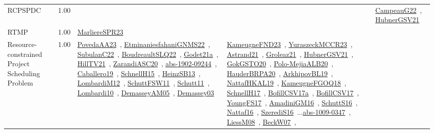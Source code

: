 {\begin{longtable}{p{3cm}r>{\raggedright\arraybackslash}p{6cm}>{\raggedright\arraybackslash}p{6cm}>{\raggedright\arraybackslash}p{8cm}}
\index{RCPSPDC}\index{Classification!RCPSPDC}RCPSPDC &  1.00 &  &  & \href{../works/CampeauG22.pdf}{CampeauG22}~\cite{CampeauG22}, \href{../works/HubnerGSV21.pdf}{HubnerGSV21}~\cite{HubnerGSV21}\\
\index{RTMP}\index{Classification!RTMP}RTMP &  1.00 & \href{../works/MarliereSPR23.pdf}{MarliereSPR23}~\cite{MarliereSPR23} &  & \\
\index{Resource-constrained Project Scheduling Problem}\index{Classification!Resource-constrained Project Scheduling Problem}Resource-constrained Project Scheduling Problem &  1.00 & \href{../works/PovedaAA23.pdf}{PovedaAA23}~\cite{PovedaAA23}, \href{../works/EtminaniesfahaniGNMS22.pdf}{EtminaniesfahaniGNMS22}~\cite{EtminaniesfahaniGNMS22}, \href{../works/SubulanC22.pdf}{SubulanC22}~\cite{SubulanC22}, \href{../works/BoudreaultSLQ22.pdf}{BoudreaultSLQ22}~\cite{BoudreaultSLQ22}, \href{../works/Godet21a.pdf}{Godet21a}~\cite{Godet21a}, \href{../works/HillTV21.pdf}{HillTV21}~\cite{HillTV21}, \href{../works/ZarandiASC20.pdf}{ZarandiASC20}~\cite{ZarandiASC20}, \href{../works/abs-1902-09244.pdf}{abs-1902-09244}~\cite{abs-1902-09244}, \href{../works/Caballero19.pdf}{Caballero19}~\cite{Caballero19}, \href{../works/SchnellH15.pdf}{SchnellH15}~\cite{SchnellH15}, \href{../works/HeinzSB13.pdf}{HeinzSB13}~\cite{HeinzSB13}, \href{../works/LombardiM12.pdf}{LombardiM12}~\cite{LombardiM12}, \href{../works/SchuttFSW11.pdf}{SchuttFSW11}~\cite{SchuttFSW11}, \href{../works/Schutt11.pdf}{Schutt11}~\cite{Schutt11}, \href{../works/Lombardi10.pdf}{Lombardi10}~\cite{Lombardi10}, \href{../works/DemasseyAM05.pdf}{DemasseyAM05}~\cite{DemasseyAM05}, \href{../works/Demassey03.pdf}{Demassey03}~\cite{Demassey03} & \href{../works/KameugneFND23.pdf}{KameugneFND23}~\cite{KameugneFND23}, \href{../works/YuraszeckMCCR23.pdf}{YuraszeckMCCR23}~\cite{YuraszeckMCCR23}, \href{../works/Astrand21.pdf}{Astrand21}~\cite{Astrand21}, \href{../works/Groleaz21.pdf}{Groleaz21}~\cite{Groleaz21}, \href{../works/HubnerGSV21.pdf}{HubnerGSV21}~\cite{HubnerGSV21}, \href{../works/GokGSTO20.pdf}{GokGSTO20}~\cite{GokGSTO20}, \href{../works/Polo-MejiaALB20.pdf}{Polo-MejiaALB20}~\cite{Polo-MejiaALB20}, \href{../works/HauderBRPA20.pdf}{HauderBRPA20}~\cite{HauderBRPA20}, \href{../works/ArkhipovBL19.pdf}{ArkhipovBL19}~\cite{ArkhipovBL19}, \href{../works/NattafHKAL19.pdf}{NattafHKAL19}~\cite{NattafHKAL19}, \href{../works/KameugneFGOQ18.pdf}{KameugneFGOQ18}~\cite{KameugneFGOQ18}, \href{../works/SchnellH17.pdf}{SchnellH17}~\cite{SchnellH17}, \href{../works/BofillCSV17a.pdf}{BofillCSV17a}~\cite{BofillCSV17a}, \href{../works/BofillCSV17.pdf}{BofillCSV17}~\cite{BofillCSV17}, \href{../works/YoungFS17.pdf}{YoungFS17}~\cite{YoungFS17}, \href{../works/AmadiniGM16.pdf}{AmadiniGM16}~\cite{AmadiniGM16}, \href{../works/SchuttS16.pdf}{SchuttS16}~\cite{SchuttS16}, \href{../works/Nattaf16.pdf}{Nattaf16}~\cite{Nattaf16}, \href{../works/SzerediS16.pdf}{SzerediS16}~\cite{SzerediS16}...\href{../works/abs-1009-0347.pdf}{abs-1009-0347}~\cite{abs-1009-0347}, \href{../works/LiessM08.pdf}{LiessM08}~\cite{LiessM08}, \href{../works/BeckW07.pdf}{BeckW07}~\cite{BeckW07}, 
\end{longtable}}

